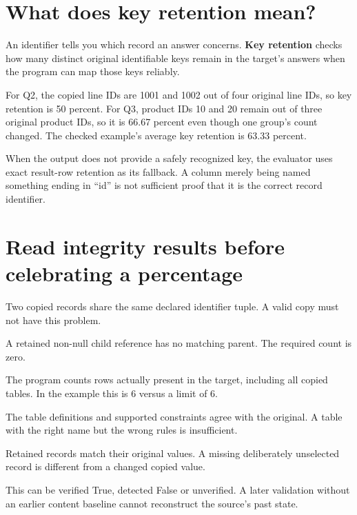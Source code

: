 \documentclass[12pt,a4paper,oneside]{report}
\begin{document}
\section{What does key retention mean?}
An identifier tells you which record an answer concerns. \textbf{Key retention} checks how many distinct original identifiable keys remain in the target's answers when the program can map those keys reliably.

For Q2, the copied line IDs are 1001 and 1002 out of four original line IDs, so key retention is 50 percent. For Q3, product IDs 10 and 20 remain out of three original product IDs, so it is 66.67 percent even though one group's count changed. The checked example's average key retention is 63.33 percent.

When the output does not provide a safely recognized key, the evaluator uses exact result-row retention as its fallback. A column merely being named something ending in ``id'' is not sufficient proof that it is the correct record identifier.

\section{Read integrity results before celebrating a percentage}
\begin{description}[style=nextline,leftmargin=1.5em,labelindent=0pt]
\item[Duplicate primary keys] Two copied records share the same declared identifier tuple. A valid copy must not have this problem.
\item[Foreign-key violations] A retained non-null child reference has no matching parent. The required count is zero.
\item[Actual rows versus budget] The program counts rows actually present in the target, including all copied tables. In the example this is 6 versus a limit of 6.
\item[Schema compatibility] The table definitions and supported constraints agree with the original. A table with the right name but the wrong rules is insufficient.
\item[Copied values] Retained records match their original values. A missing deliberately unselected record is different from a changed copied value.
\item[Source unchanged] This can be verified True, detected False or unverified. A later validation without an earlier content baseline cannot reconstruct the source's past state.
\end{description}
\end{document}
